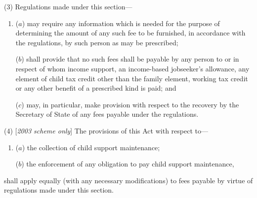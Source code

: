 \documentclass[12pt,a4paper]{article}
\begin{document}
(3) Regulations made under this section—
\begin{enumerate}\item[]
($a$) may require any information which is needed for the purpose of determining the amount of any such fee to be furnished, in accordance with the regulations, by such person as may be prescribed;

($b$) shall provide that no such fees shall be payable by any person to or in respect of whom income support, 
an income-based jobseeker’s allowance,  %
any element of child tax credit other than the family element, working tax credit  %
or any other benefit of a prescribed kind is paid; and

($c$) may, in particular, make provision with respect to the recovery by the Secretary of State of any fees payable under the regulations.
\end{enumerate}

(4) [\emph{2003 scheme only}] The provisions of this Act with respect to—
\begin{enumerate}\item[]
($a$) the collection of child support maintenance;

($b$) the enforcement of any obligation to pay child support maintenance,
\end{enumerate}
shall apply equally (with any necessary modifications) to fees payable by virtue of regulations made under this section.

\end{document}
